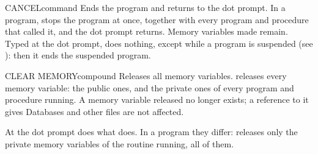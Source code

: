 \begin{XbaseEntry}{CANCEL}{command}
Ends the program and returns to the dot prompt.
\Syntax
{}
\Usage
In a program,  stops the program at once, together with every
program and procedure that called it, and the dot prompt returns.  Memory
variables made  remain.  Typed at the dot prompt, 
does nothing, except while a program is suspended (see ): then it
ends the suspended program.
\end{XbaseEntry}

\begin{XbaseEntry}{CLEAR MEMORY}{compound}%
Releases all memory variables.
\Syntax
{}
\Usage
{} releases every memory variable: the public ones, and the
private ones of every program and procedure running.  A memory variable
released no longer exists; a reference to it gives
  Databases and other files are not affected.

At the dot prompt  does what  does.  In a
program they differ:  releases only the private memory
variables of the routine running,  all of them.
\Examples
{}
\end{XbaseEntry}


